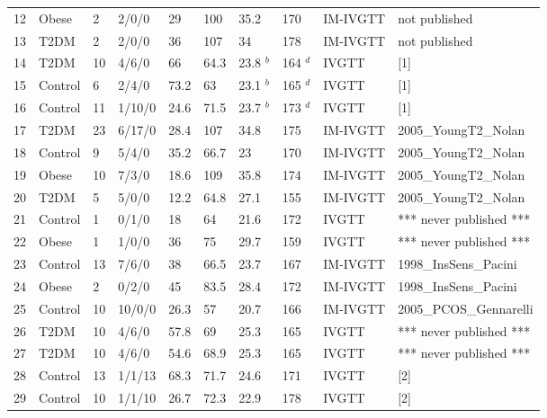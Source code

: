 \documentclass[utf8]{frontiersSCNS} %
\begin{document}
\begin{table}[h]
{\begin{tabular}{llllllllll}
12 & Obese   & 2  & 2/0/0   & 29     & 100     & 35.2   & 170   & IM-IVGTT & not published            \\
13 & T2DM    & 2  & 2/0/0   & 36     & 107     & 34     & 178   & IM-IVGTT & not published            \\
14 & T2DM    & 10 & 4/6/0   & 66     & 64.3    & 23.8 $^b$ & 164 $^d$ & IVGTT    & [1]                      \\
15 & Control & 6  & 2/4/0   & 73.2   & 63      & 23.1 $^b$ & 165 $^d$ & IVGTT    & [1]                      \\
16 & Control & 11 & 1/10/0  & 24.6   & 71.5    & 23.7 $^b$ & 173 $^d$ & IVGTT    & [1]                      \\
17 & T2DM    & 23 & 6/17/0  & 28.4   & 107     & 34.8   & 175   & IM-IVGTT & 2005_YoungT2_Nolan       \\
18 & Control & 9  & 5/4/0   & 35.2   & 66.7    & 23     & 170   & IM-IVGTT & 2005_YoungT2_Nolan       \\
19 & Obese   & 10 & 7/3/0   & 18.6   & 109     & 35.8   & 174   & IM-IVGTT & 2005_YoungT2_Nolan       \\
20 & T2DM    & 5  & 5/0/0   & 12.2   & 64.8    & 27.1   & 155   & IM-IVGTT & 2005_YoungT2_Nolan       \\
21 & Control & 1  & 0/1/0   & 18     & 64      & 21.6   & 172   & IVGTT    & *** never published ***  \\
22 & Obese   & 1  & 1/0/0   & 36     & 75      & 29.7   & 159   & IVGTT    & *** never published ***  \\
23 & Control & 13 & 7/6/0   & 38     & 66.5    & 23.7   & 167   & IM-IVGTT & 1998_InsSens_Pacini      \\
24 & Obese   & 2  & 0/2/0   & 45     & 83.5    & 28.4   & 172   & IM-IVGTT & 1998_InsSens_Pacini      \\
25 & Control & 10 & 10/0/0  & 26.3   & 57      & 20.7   & 166   & IM-IVGTT & 2005_PCOS_Gennarelli     \\
26 & T2DM    & 10 & 4/6/0   & 57.8   & 69      & 25.3   & 165   & IVGTT    & *** never published ***  \\
27 & T2DM    & 10 & 4/6/0   & 54.6   & 68.9    & 25.3   & 165   & IVGTT    & *** never published ***  \\
28 & Control & 13 & 1/1/13  & 68.3   & 71.7    & 24.6   & 171   & IVGTT    & [2]                      \\
29 & Control & 10 & 1/1/10  & 26.7   & 72.3    & 22.9   & 178   & IVGTT    & [2]                      \\

\end{tabular}}
\end{table}
\end{document}
